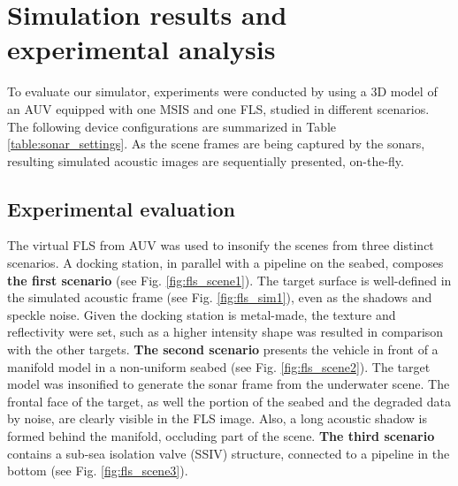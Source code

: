\documentclass[final,5p,times]{elsarticle}
\begin{document}
\section{Simulation results and experimental analysis}
\label{results}

To evaluate our simulator, experiments were conducted by using a 3D model
of an AUV equipped with one MSIS and one FLS, studied in different scenarios.
The following device configurations are summarized in
Table \ref{table:sonar_settings}. As the scene frames are being captured by
the sonars, resulting simulated acoustic images are sequentially presented,
on-the-fly.

\subsection{Experimental evaluation}

The virtual FLS from AUV was used to insonify the scenes from three distinct
scenarios. A docking station, in parallel with a pipeline on the seabed,
composes \textbf{the first scenario} (see Fig. \ref{fig:fls_scene1}). The
target surface is well-defined in the simulated acoustic frame (see
Fig. \ref{fig:fls_sim1}), even as the shadows and speckle noise. Given the
docking station is metal-made, the texture and reflectivity were set, such
as a higher intensity shape was resulted in comparison with the other targets.
\textbf{The second scenario} presents the vehicle in front of a manifold model
in a non-uniform seabed (see Fig. \ref{fig:fls_scene2}). The target model was
insonified to generate the sonar frame from the underwater scene. The frontal
face of the target, as well the portion of the seabed and the degraded data
by noise, are clearly visible in the FLS image. Also, a long acoustic shadow
is formed behind the manifold, occluding part of the scene. \textbf{The
third scenario} contains a sub-sea isolation valve (SSIV) structure, connected
to a pipeline in the bottom (see Fig. \ref{fig:fls_scene3}).
\end{document}
